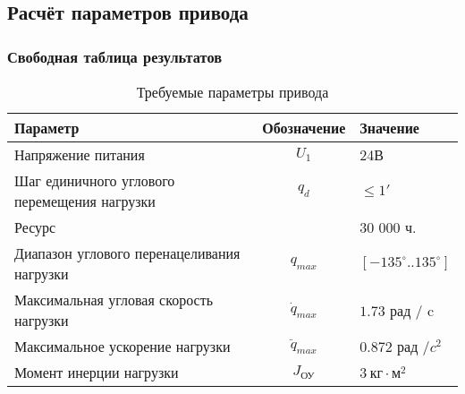 \subsection{Расчёт параметров привода}



\subsubsection{Свободная таблица результатов}

\begin{table}[h!]
    \centering
    \begin{tabular}{|l|c|l|}
        \hline
        Параметр                                    & Обозначение      & Значение                           \\
        \hline
        Напряжение питания                          & $U_1$            & 24В                                \\
        Шаг единичного углового перемещения нагрузки& $q_d$            & $ \le 1' $                         \\
        Ресурс                                      &                  & 30 000 ч.                          \\
        Диапазон углового перенацеливания нагрузки  & $q_{max}$        & $[-135^\circ .. 135^\circ] $       \\
        Максимальная угловая скорость нагрузки      & $\dot{q}_{max}$  & $1.73$ рад / c                     \\
        Максимальное ускорение нагрузки             & $\ddot{q}_{max}$ & $0.872$ рад /$c^2$                 \\
        Момент инерции нагрузки                     & $J_{\text{ОУ}}$  & $3 ~\text{кг} \cdot \text{м}^2 $   \\
        \hline
    \end{tabular}
    \caption{Требуемые параметры привода}
    \label{drive_parameters_tbl}
\end{table}

\endinput
